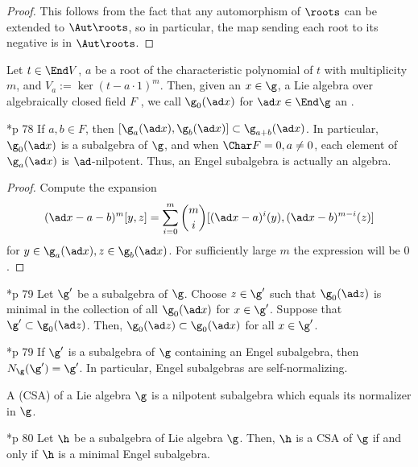 \documentclass[11pt,leqno,oneside]{amsart}
\numberwithin{thm}{section}
\begin{document}
\begin{proof}
  This follows from the fact that any automorphism of \(\roots\) can
  be extended to \(\Aut \roots\), so in particular, the map sending
  each root to its negative is in \(\Aut \roots\).
\end{proof}
\begin{defn}
  Let \(t \in \End V\), \(a\) be a root of the characteristic
  polynomial of \(t\) with multiplicity \(m\), and \(V_a := \ker (t-a
  \cdot 1)^m\). Then, given an \(x \in \g\), a Lie algebra over
  algebraically closed field \(F\) , we call \(\g_0(\ad x)\) for \(\ad x
  \in \End \g\) an .
\end{defn}
\begin{lem}
  \cite{humph}*{p 78} If \(a,b \in F\), then \([\g_a(\ad x), \g_b(\ad x)] \subset
  \g_{a+b}(\ad x)\). In particular, \(\g_0(\ad x)\) is a subalgebra of
  \(\g\), and when \(\Char F = 0, a \neq 0\), each element of
  \(\g_a(\ad x)\) is \(\ad\)-nilpotent. Thus, an Engel subalgebra is
  actually an algebra.
\end{lem}
\begin{proof}
  Compute the expansion \[
    (\ad x-a-b)^m[y,z] = \sum_{i=0}^m \binom{m}{i}[(\ad x - a)^i(y),
    (\ad x - b)^{m-i}(z)]
  \] for \(y \in \g_a(\ad x), z \in
  \g_b(\ad x)\). For sufficiently large \(m\) the expression will be \(0\).
\end{proof}
\begin{lem}
  \cite{humph}*{p 79} Let \(\g'\) be a subalgebra of \(\g\). Choose \(z \in \g'\) such
  that \(\g_0(\ad z)\) is minimal in the collection of all \(\g_0(\ad
  x)\) for \(x \in \g'\). Suppose that \(\g' \subset \g_0(\ad
  z)\). Then, \(\g_0(\ad z) \subset \g_0(\ad x)\) for all \(x \in \g'\).
\end{lem}
\begin{lem}
  \cite{humph}*{p 79} If \(\g'\) is a subalgebra of \(\g\) containing an Engel subalgebra,
  then \(N_\g(\g') = \g'\). In particular, Engel subalgebras are
  self-normalizing.
\end{lem}
\begin{defn}
  A  (CSA) of a Lie algebra \(\g\) is a nilpotent
  subalgebra which equals its normalizer in \(\g\). 
\end{defn}
\begin{thm}
  \cite{humph}*{p 80} Let \(\h\) be a subalgebra of Lie algebra \(\g\). Then, \(\h\) is a
  CSA of \(\g\) if and only if \(\h\) is a minimal Engel subalgebra.
\end{thm}
\end{document}
